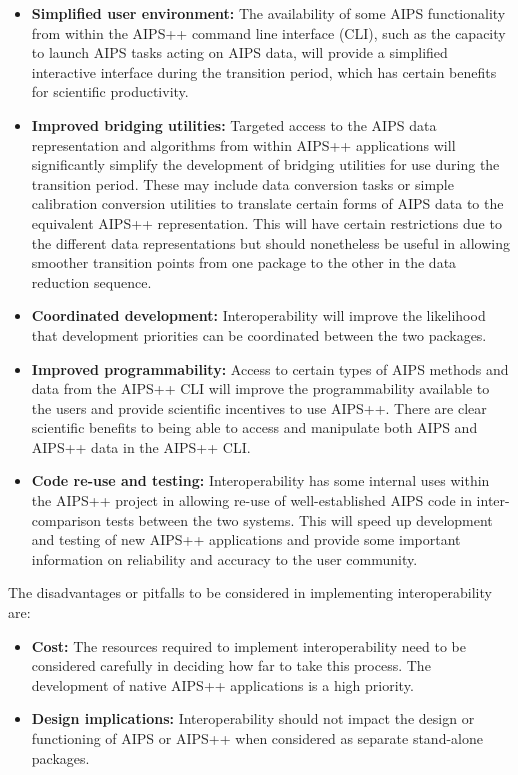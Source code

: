 \begin{itemize}

\item{{\bf Simplified user environment:} The availability of some AIPS
functionality from within the AIPS++ command line interface (CLI),
such as the capacity to launch AIPS tasks acting on AIPS data, will
provide a simplified interactive interface during the transition
period, which has certain benefits for scientific productivity.}

\item {{\bf Improved bridging utilities:} Targeted access to the AIPS
data representation and algorithms from within AIPS++ applications
will significantly simplify the development of bridging utilities for
use during the transition period. These may include data conversion
tasks or simple calibration conversion utilities to translate certain
forms of AIPS data to the equivalent AIPS++ representation. This will
have certain restrictions due to the different data representations but
should nonetheless be useful in allowing smoother transition points
from one package to the other in the data reduction sequence.}

\item {{\bf Coordinated development:} Interoperability will improve
the likelihood that development priorities can be coordinated between
the two packages.}

\item {{\bf Improved programmability:} Access to certain types of AIPS
methods and data from the AIPS++ CLI will improve the programmability
available to the users and provide scientific incentives to use
AIPS++. There are clear scientific benefits to being able to access
and manipulate both AIPS and AIPS++ data in the AIPS++ CLI.}

\item {{\bf Code re-use and testing:} Interoperability has some
internal uses within the AIPS++ project in allowing re-use of
well-established AIPS code in inter-comparison tests between the two
systems. This will speed up development and testing of new AIPS++
applications and provide some important information on reliability and
accuracy to the user community.}

\end{itemize}

The disadvantages or pitfalls to be considered in implementing
interoperability are:

\begin{itemize}

\item{{\bf Cost:} The resources required to implement interoperability
need to be considered carefully in deciding how far to take this
process. The development of native AIPS++ applications is a high
priority.}

\item{{\bf Design implications:} Interoperability should not impact
the design or functioning of AIPS or AIPS++ when considered as
separate stand-alone packages.}

\end{itemize}

